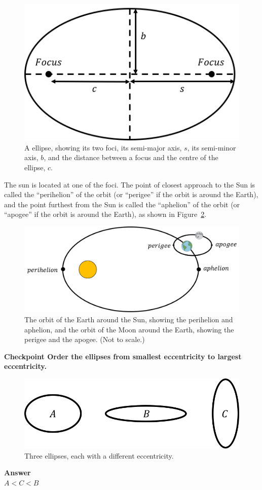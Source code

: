 \begin{figure}[!htbp]
\centering
\includegraphics[width=0.5\linewidth]{files/ellipse-b667a65c43d5aca4ae37d847a50bedd1.png}
\caption[]{A ellipse, showing its two foci, its semi-major axis, $s$, its semi-minor axis, $b$, and the distance between a focus and the centre of the ellipse, $c$.}
\label{fig:gravity:ellipse}
\end{figure}

The sun is located at one of the foci. The point of closest approach to the Sun is called the ``perihelion'' of the orbit (or ``perigee'' if the orbit is around the Earth), and the point furthest from the Sun is called the ``aphelion'' of the orbit (or ``apogee'' if the orbit is around the Earth), as shown in Figure~\ref{fig:gravity:perigeeapogee}.

\begin{figure}[!htbp]
\centering
\includegraphics[width=0.7\linewidth]{files/periapogee-c6a3c9e74d40c0700ad95bdce1e3e6d3.png}
\caption[]{The orbit of the Earth around the Sun, showing the perihelion and aphelion, and the orbit of the Moon around the Earth, showing the perigee and the apogee. (Not to scale.)}
\label{fig:gravity:perigeeapogee}
\end{figure}

\begin{framed}
\textbf{Checkpoint Order the ellipses from smallest eccentricity to largest eccentricity.}\\
\begin{figure}[!htbp]
\centering
\includegraphics[width=0.7\linewidth]{files/eccellipses-23574212dfb6295ea0c1558daf1b860e.png}
\caption[]{Three ellipses, each with a different eccentricity.}
\label{fig:gravity:eccellipses}
\end{figure}

\begin{framed}
\textbf{Answer}\\
$A<C<B$
\end{framed}
\end{framed}

